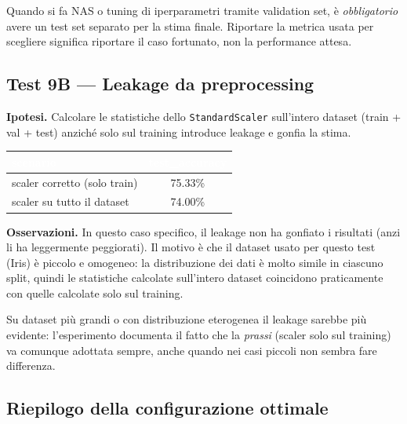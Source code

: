 \documentclass[11pt,a4paper]{article}
\newcommand{\fnt}{\texttt}     %
\begin{document}
\begin{concetto}
Quando si fa NAS o tuning di iperparametri tramite validation set, è
\emph{obbligatorio} avere un test set separato per la stima finale.
Riportare la metrica usata per scegliere significa riportare il caso
fortunato, non la performance attesa.
\end{concetto}

\subsection{Test 9B — Leakage da preprocessing}

\textbf{Ipotesi.} Calcolare le statistiche dello \fnt{StandardScaler}
sull'intero dataset (train + val + test) anziché solo sul training
introduce leakage e gonfia la stima.

\begin{center}
\begin{tabular}{lc}
    \toprule
    \rowcolor{headerblue}
    \textcolor{white}{\textbf{scenario}} &
    \textcolor{white}{\textbf{test\_accuracy}} \\
    \midrule
    scaler corretto (solo train)   & 75.33\% \\
    \rowcolor{rowgray}
    scaler su tutto il dataset     & 74.00\% \\
    \bottomrule
\end{tabular}
\end{center}

\textbf{Osservazioni.}
In questo caso specifico, il leakage non ha gonfiato i risultati (anzi
li ha leggermente peggiorati). Il motivo è che il dataset usato per
questo test (Iris) è piccolo e omogeneo: la distribuzione dei dati è
molto simile in ciascuno split, quindi le statistiche calcolate
sull'intero dataset coincidono praticamente con quelle calcolate solo sul
training.

Su dataset più grandi o con distribuzione eterogenea il leakage sarebbe
più evidente: l'esperimento documenta il fatto che la \emph{prassi}
(scaler solo sul training) va comunque adottata sempre, anche quando
nei casi piccoli non sembra fare differenza.

\subsection{Riepilogo della configurazione ottimale}
\end{document}
